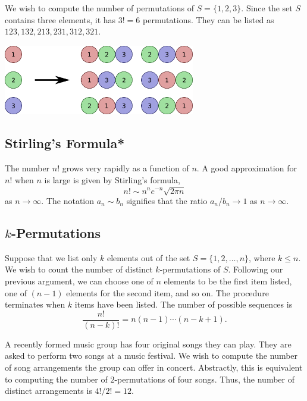 \begin{example}
We wish to compute the number of permutations of $S = \{ 1, 2, 3 \}$.
Since the set $S$ contains three elements, it has $3! = 6$ permutations.
They can be listed as $123, 132, 213, 231, 312, 321$.
\end{example}

\begin{center}
\includegraphics[height=3.06cm]{Figures/4Chapter/permutation}
\end{center}


\subsection{Stirling's Formula*}

The number $n!$ grows very rapidly as a function of $n$.
A good approximation for $n!$ when $n$ is large is given by Stirling's formula,
\begin{equation*}
n! \sim n^n e^{-n} \sqrt{ 2 \pi n}
\end{equation*}
as $n \rightarrow \infty$.
The notation $a_n \sim b_n$ signifies that the ratio $a_n / b_n \rightarrow 1$ as $n \rightarrow \infty$.


\subsection{$k$-Permutations}

Suppose that we list only $k$ elements out of the set $S = \{ 1, 2, \ldots, n \}$, where $k \leq n$.
We wish to count the number of distinct $k$-permutations of $S$.
Following our previous argument, we can choose one of $n$ elements to be the first item listed, one of $(n-1)$ elements for the second item, and so on.
The procedure terminates when $k$ items have been listed.
The number of possible sequences is
\begin{equation*}
\frac{n!}{(n-k)!} = n (n-1) \cdots (n-k+1) .
\end{equation*}

\begin{example}
A recently formed music group has four original songs they can play.
They are asked to perform two songs at a music festival.
We wish to compute the number of song arrangements the group can offer in concert.
Abstractly, this is equivalent to computing the number of $2$-permutations of four songs.
Thus, the number of distinct arrangements is ${4!}/{2!} = 12$.
\end{example}

